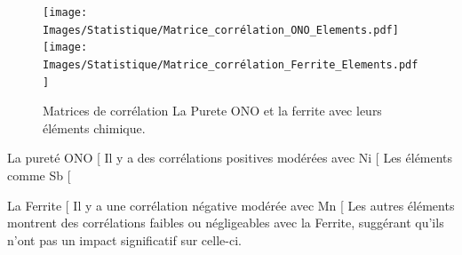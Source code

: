 \documentclass[12pt]{article}
\begin{document}




\begin{figure}[H]
    \centering
    \begin{adjustbox}{width=1.3\textwidth,center}
        \texttt{[image: Images/Statistique/Matrice\_corrélation\_ONO\_Elements.pdf]}
        \texttt{[image: Images/Statistique/Matrice\_corrélation\_Ferrite\_Elements.pdf]}
    \end{adjustbox}
    \caption{Matrices de corrélation La Purete ONO et la ferrite avec leurs éléments chimique.}
    \label{fig:correlations Ferrite_ONO}
\end{figure}

La pureté ONO [%
Il y a des corrélations positives modérées avec Ni [%
Les éléments comme Sb [%


La Ferrite [%
Il y a une corrélation négative modérée avec Mn [%
Les autres éléments montrent des corrélations faibles ou négligeables avec la Ferrite, suggérant qu’ils n’ont pas un impact significatif sur celle-ci.






\end{document}
